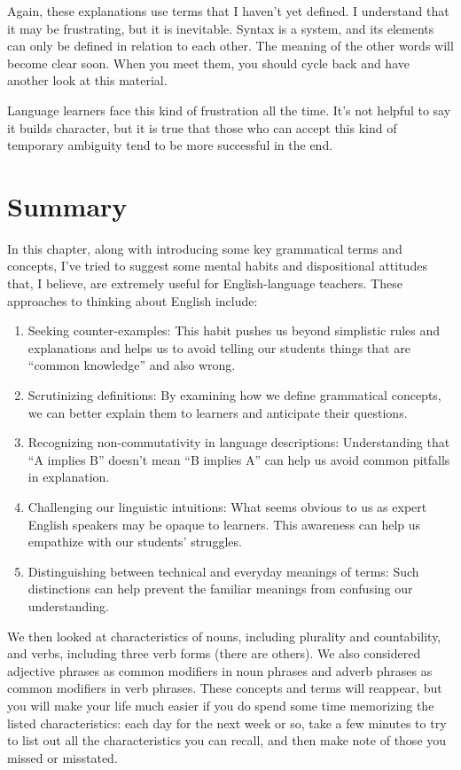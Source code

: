 Again, these explanations use terms that I haven't yet defined. I understand that it may be frustrating, but it is inevitable. Syntax is a system, and its elements can only be defined in relation to each other. The meaning of the other words will become clear soon. When you meet them, you should cycle back and have another look at this material.

Language learners face this kind of frustration all the time. It's not helpful to say it builds character, but it is true that those who can accept this kind of temporary ambiguity tend to be more successful in the end.

\section{Summary}
In this chapter, along with introducing some key grammatical terms and concepts, I've tried to suggest some mental habits and dispositional attitudes that, I believe, are extremely useful for English-language teachers. These approaches to thinking about English include:
\begin{enumerate}[noitemsep]
    \item Seeking counter-examples: This habit pushes us beyond simplistic rules and explanations and helps us to avoid telling our students things that are ``common knowledge'' and also wrong.
    \item Scrutinizing definitions: By examining how we define grammatical concepts, we can better explain them to learners and anticipate their questions.
    \item Recognizing non-commutativity in language descriptions: Understanding that ``A implies B'' doesn't mean ``B implies A'' can help us avoid common pitfalls in explanation.
    \item Challenging our linguistic intuitions: What seems obvious to us as expert English speakers may be opaque to learners. This awareness can help us empathize with our students' struggles.
    \item Distinguishing between technical and everyday meanings of terms: Such distinctions can help prevent the familiar meanings from confusing our understanding.
\end{enumerate}

We then looked at characteristics of nouns, including plurality and countability, and verbs, including three verb forms (there are others). We also considered adjective phrases as common modifiers in noun phrases and adverb phrases as common modifiers in verb phrases. These concepts and terms will reappear, but you will make your life much easier if you do spend some time memorizing the listed characteristics: each day for the next week or so, take a few minutes to try to list out all the characteristics you can recall, and then make note of those you missed or misstated.

